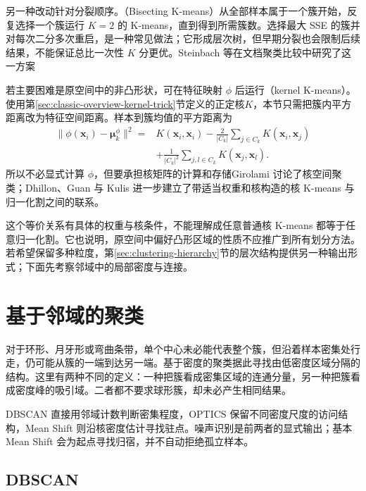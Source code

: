 另一种改动针对分裂顺序。（Bisecting K-means）从全部样本属于一个簇开始，反复选择一个簇运行 $K=2$ 的 K-means，直到得到所需簇数。选择最大 SSE 的簇并对每次二分多次重启，是一种常见做法；它形成层次树，但早期分裂也会限制后续结果，不能保证总比一次性 $K$ 分更优。Steinbach 等在文档聚类比较中研究了这一方案

\Needspace{105mm}
若主要困难是原空间中的非凸形状，可在特征映射 $\phi$ 后运行（kernel K-means）。使用第\ref{sec:classic-overview-kernel-trick}节定义的正定核$K$，本节只需把簇内平方距离改为特征空间距离。样本到簇均值的平方距离为
\begin{equation}
 \begin{aligned}
 \lVert\phi(\bm{x}_i)-\bm{\mu}_k^\phi\rVert^2
 ={}&K(\bm{x}_i,\bm{x}_i)
 -\frac{2}{|C_k|}\sum_{j\in C_k}K(\bm{x}_i,\bm{x}_j)\\
 &+\frac{1}{|C_k|^2}
   \sum_{j,l\in C_k}K(\bm{x}_j,\bm{x}_l).
 \end{aligned}
 \label{eq:clustering-kernel-kmeans}
\end{equation}
所以不必显式计算 $\phi$，但要承担核矩阵的计算和存储Girolami 讨论了核空间聚类；Dhillon、Guan 与 Kulis 进一步建立了带适当权重和核构造的核 K-means 与归一化割之间的联系。

这个等价关系有具体的权重与核条件，不能理解成任意普通核 K-means 都等于任意归一化割。它也说明，原空间中偏好凸形区域的性质不应推广到所有划分方法。若希望保留多种粒度，第\ref{sec:clustering-hierarchy}节的层次结构提供另一种输出形式；下面先考察邻域中的局部密度与连接。

\section{基于邻域的聚类}
\label{sec:clustering-density}

对于环形、月牙形或弯曲条带，单个中心未必能代表整个簇，但沿着样本密集处行走，仍可能从簇的一端到达另一端。基于密度的聚类据此寻找由低密度区域分隔的结构。这里有两种不同的定义：一种把簇看成密集区域的连通分量，另一种把簇看成密度峰的吸引域。二者都不要求球形簇，却未必产生相同结果。

DBSCAN 直接用邻域计数判断密集程度，OPTICS 保留不同密度尺度的访问结构，Mean Shift 则沿核密度估计寻找驻点。噪声识别是前两者的显式输出；基本 Mean Shift 会为起点寻找归宿，并不自动拒绝孤立样本。

\subsection{DBSCAN}
\label{sec:clustering-dbscan}

